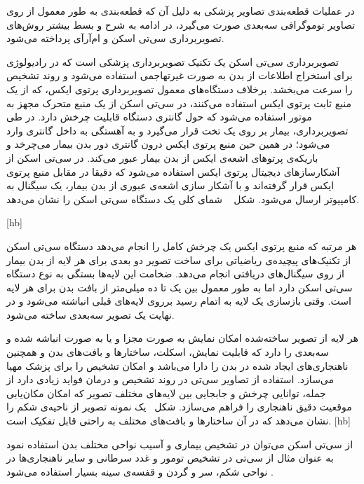 در عملیات قطعه‌بندی تصاویر پزشکی به دلیل آن که قطعه‌بندی به طور معمول از روی تصاویر توموگرافی سه‌بعدی صورت می‌گیرد، در ادامه به شرح و بسط بیشتر روش‌های تصویربرداری سی‌تی اسکن و ام‌آرآی پرداخته می‌شود. 
 

تصویربرداری سی‌تی اسکن یک تکنیک تصویربرداری پزشکی است که در رادیولوژی برای استخراج اطلاعات از بدن به صورت غیرتهاجمی استفاده می‌شود و روند تشخیص را سرعت می‌بخشد. برخلاف دستگاه‌های معمول تصویربرداری پرتوی ایکس، که از یک منبع ثابت پرتوی ایکس استفاده می‌کنند، در سی‌تی اسکن از یک منبع متحرک مجهز به موتور استفاده می‌شود که حول گانتری دستگاه قابلیت چرخش دارد. در طی تصویربرداری، بیمار بر روی یک تخت قرار می‌گیرد و به آهستگی به داخل گانتری وارد می‌شود؛ در همین حین منبع پرتوی ایکس درون گانتری دور بدن بیمار می‌چرخد و باریکه‌ی پرتوهای اشعه‌ی ایکس از بدن بیمار عبور می‌کند. در سی‌تی اسکن  از آشکارسازهای دیجیتال پرتوی ایکس استفاده می‌شود که دقیقا در مقابل منبع پرتوی‌ ایکس قرار گرفته‌اند و با آشکار سازی اشعه‌ی عبوری از بدن بیمار، یک سیگنال به کامپیوتر ارسال می‌شود. شکل ~ شمای کلی یک دستگاه سی‌تی اسکن را نشان می‌دهد.

[hb]

هر مرتبه که منبع پرتوی ایکس یک چرخش کامل را انجام می‌دهد دستگاه سی‌تی اسکن از تکنیک‌های پیچیده‌ی ریاضیاتی برای ساخت تصویر دو بعدی برای هر لایه از بدن بیمار از روی سیگنال‌های دریافتی انجام می‌دهد. ضخامت این لایه‌ها بستگی به نوع دستگاه سی‌تی اسکن دارد اما به طور معمول بین یک تا ده میلی‌متر از بافت بدن برای هر لایه است. وقتی بازسازی یک لایه به اتمام رسید برروی لایه‌های قبلی انباشته می‌شود و در نهایت یک تصویر سه‌بعدی ساخته می‌شود.

هر لایه از تصویر ساخته‌شده امکان نمایش به صورت مجزا و یا به صورت انباشه شده و سه‌بعدی را دارد که قابلیت نمایش، اسکلت، ساختارها و بافت‌های بدن و همچنین ناهنجاری‌های ایجاد شده در بدن را دارا می‌باشد و امکان تشخیص را برای پزشک مهیا می‌سازد. استفاده از تصاویر سی‌تی در روند تشخیص و درمان فواید زیادی دارد از جمله، توانایی چرخش و جابجایی بین لایه‌های مختلف تصویر که امکان مکان‌یابی موقعیت دقیق ناهنجاری را فراهم می‌سازد. شکل~ یک نمونه تصویر از ناحیه‌ی شکم را نشان می‌دهد که در آن ساختارها و بافت‌های مختلف به راحتی قابل تفکیک است.
[hb]

از سی‌تی اسکن می‌توان در تشخیص بیماری و آسیب نواحی مختلف بدن استفاده نمود به عنوان مثال از سی‌تی در تشخیص تومور و غدد سرطانی و سایر ناهنجاری‌ها در نواحی شکم، سر و گردن و قفسه‌ی سینه بسیار استفاده می‌شود .  



